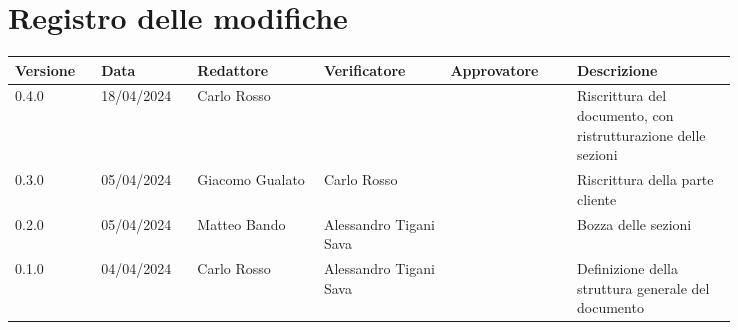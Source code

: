 \section*{Registro delle modifiche}
 {
  \scriptsize
  \begin{tabular}{p{0.10\linewidth}p{0.10\linewidth}p{0.15\linewidth}p{0.15\linewidth}p{0.15\linewidth}p{0.19\linewidth}}
	  \textbf{Versione} & \textbf{Data} & \textbf{Redattore}     & \textbf{Verificatore} & \textbf{Approvatore} & \textbf{Descrizione}                                                                                             \\
	  \hline
	  0.4.0             & 18/04/2024    & Carlo Rosso	&									&					& Riscrittura del documento, con ristrutturazione delle sezioni \\
	  \hline
	  0.3.0             & 05/04/2024    & Giacomo Gualato & Carlo Rosso						&					& Riscrittura della parte cliente \\
	  \hline
	  0.2.0             & 05/04/2024    & Matteo Bando & Alessandro Tigani Sava				&               	& Bozza delle sezioni \\ 
	  \hline
	  0.1.0             & 04/04/2024    & Carlo Rosso & Alessandro Tigani Sava              &               	& Definizione della struttura generale del documento \\
	\hline
	\end{tabular}
 }
